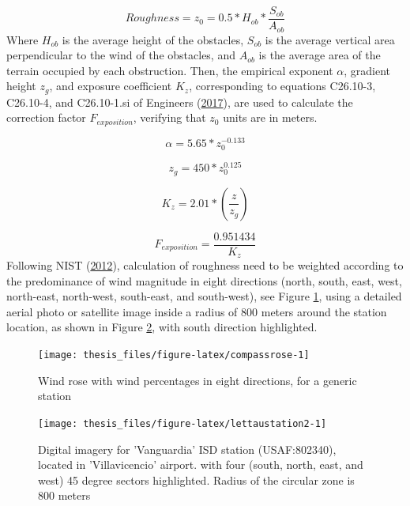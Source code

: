 \documentclass[12pt,oneside]{reedthesis}
\begin{document}
\[
Roughness = z_0= 0.5 * H_{ob}*\frac{S_{ob}}{A_{ob}}
\]
Where \(H_{ob}\) is the average height of the obstacles, \(S_{ob}\) is the average vertical area perpendicular to the wind of the obstacles, and \(A_{ob}\) is the average area of the terrain occupied by each obstruction. Then, the empirical exponent \(\alpha\), gradient height \(z_g\), and exposure coefficient \(K_z\), corresponding to equations C26.10-3, C26.10-4, and C26.10-1.si of Engineers (\protect\hyperlink{ref-Asce2017}{2017}), are used to calculate the correction factor \(F_{exposition}\), verifying that \(z_0\) units are in meters.

\[
\alpha =  5.65*z_0^{-0.133}
\]

\[
z_g=450*z_0^{0.125}
\]

\[
K_z= 2.01*\left(\frac{z}{z_g}\right)
\]

\[
F_{exposition} = \frac{0.951434}{K_z}
\]
Following NIST (\protect\hyperlink{ref-nist2012}{2012}), calculation of roughness need to be weighted according to the predominance of wind magnitude in eight directions (north, south, east, west, north-east, north-west, south-east, and south-west), see Figure \ref{fig:compassrose}, using a detailed aerial photo or satellite image inside a radius of 800 meters around the station location, as shown in Figure \ref{fig:lettaustation2}, with south direction highlighted.
\begin{figure}

{\centering \texttt{[image: thesis\_files/figure-latex/compassrose-1]} 

}

\caption{Wind rose with wind percentages in eight directions, for a generic station}\label{fig:compassrose}
\end{figure}
\footnotesize
\begin{figure}

{\centering \texttt{[image: thesis\_files/figure-latex/lettaustation2-1]} 

}

\caption{Digital imagery for 'Vanguardia' ISD station (USAF:802340), located in 'Villavicencio' airport. with four (south, north, east, and west) 45 degree sectors highlighted. Radius of the circular zone is 800 meters}\label{fig:lettaustation2}
\end{figure}
\normalsize
\end{document}
